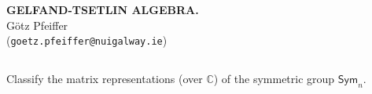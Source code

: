 \documentclass[a4paper]{amsart}
\newcommand{\C}{\mathbb{C}}
\newcommand{\Sym}{\mathsf{Sym}}
\begin{document}
\begin{center}
  \textbf{\uppercase{
Gelfand-Tsetlin Algebra.
}}\\
G\"otz Pfeiffer \\
(\texttt{goetz.pfeiffer@nuigalway.ie})
\end{center}

\subsection{}
Classify the matrix representations (over $\C$) of the symmetric group $\Sym_n$.
\end{document}
